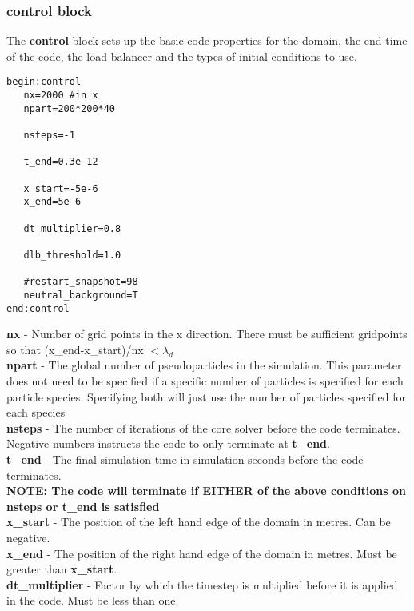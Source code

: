 \documentclass[12pt]{article}
\newcommand{\emphtext}{\color{warwickdark} \fontfamily{phv}\selectfont\Large\bf}
\newcommand{\boxverbatim}[1]{\begin{Verbatim}[obeytabs=true,frame=single,
  framerule=0.5mm,rulecolor=\color{warwickmid},label=#1]}
\newcommand{\inlineemph}[1]{{\color{warwicklight} \bf{#1}}}
\newcommand{\cemph}[1]{{\inlineemph{#1}}}
\begin{document}
\subsubsection{\cemph{control} block}
The \cemph{control} block sets up the basic code properties for the
domain, the end time of the code, the load balancer and the types of initial
conditions to use.

\boxverbatim{control block}
begin:control
   nx=2000 #in x
   npart=200*200*40

   nsteps=-1

   t_end=0.3e-12

   x_start=-5e-6
   x_end=5e-6

   dt_multiplier=0.8

   dlb_threshold=1.0

   #restart_snapshot=98
   neutral_background=T
end:control
\end{Verbatim}


{\emphtext nx} - Number of grid points in the x direction. There must be
sufficient gridpoints so that (x\_end-x\_start)/nx $< \lambda_d$\\

{\emphtext npart} - The global number of pseudoparticles in the
simulation. This parameter does not need to be specified if a specific number
of particles is specified for each particle species. Specifying both will just
use the number of particles specified for each species\\

{\emphtext nsteps} - The number of iterations of the core solver before the
code terminates. Negative numbers instructs the code to only terminate at
\inlineemph{t\_end}.\\

{\emphtext t\_end} - The final simulation time in simulation seconds before the
code terminates.\\

{\emphtext NOTE: The code will terminate if EITHER of the above conditions on
nsteps or t\_end is satisfied}\\

{\emphtext x\_start} - The position of the left hand edge of the domain in
metres. Can be negative.\\

{\emphtext x\_end} - The position of the right hand edge of the domain in
metres. Must be greater than \inlineemph{x\_start}.\\

{\emphtext dt\_multiplier} - Factor by which the timestep is multiplied before
it is applied in the code. Must be less than one.\\
\end{document}
